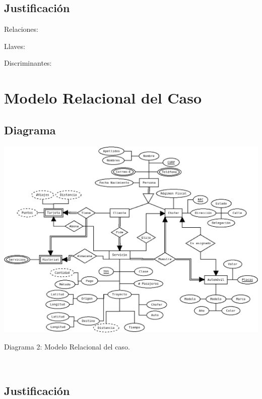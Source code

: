 \documentclass{article}
\begin{document}
       \subsection{Justificación}

       Relaciones:
       \begin{itemize}

       \end{itemize}

       Llaves:
       \begin{itemize}

       \end{itemize}

       Discriminantes:
       \begin{itemize}

       \end{itemize}

       \section{Modelo Relacional del Caso}

       \subsection{Diagrama}

       \includegraphics[width=15cm]{ER.png}\\
       \centerline{Diagrama 2: Modelo Relacional del caso.}\\

       \subsection{Justificación}
\end{document}
